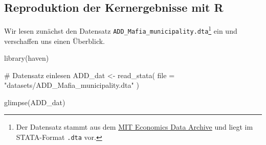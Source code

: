 \documentclass[
  a4paper,
  DIV=11,
  oneside]{scrreprt}
\newenvironment{Shaded}{\begin{snugshade}}{\end{snugshade}}
\newcommand{\AttributeTok}[1]{\textcolor[rgb]{0.40,0.45,0.13}{#1}}
\newcommand{\CommentTok}[1]{\textcolor[rgb]{0.37,0.37,0.37}{#1}}
\newcommand{\FunctionTok}[1]{\textcolor[rgb]{0.28,0.35,0.67}{#1}}
\newcommand{\NormalTok}[1]{\textcolor[rgb]{0.00,0.23,0.31}{#1}}
\newcommand{\OtherTok}[1]{\textcolor[rgb]{0.00,0.23,0.31}{#1}}
\newcommand{\StringTok}[1]{\textcolor[rgb]{0.13,0.47,0.30}{#1}}
\begin{document}
\subsection{Reproduktion der Kernergebnisse mit
R}\label{reproduktion-der-kernergebnisse-mit-r}

Wir lesen zunächst den Datensatz
\texttt{ADD\_Mafia\_municipality.dta}\footnote{Der Datensatz stammt aus
  dem
  \href{https://economics.mit.edu/people/faculty/daron-acemoglu/data-archive}{MIT
  Economics Data Archive} und liegt im STATA-Format \texttt{.dta} vor.}
ein und verschaffen uns einen Überblick.

\begin{Shaded}
\begin{Highlighting}[]
\FunctionTok{library}\NormalTok{(haven)}

\CommentTok{\# Datensatz einlesen}
\NormalTok{ADD\_dat }\OtherTok{\textless{}{-}} \FunctionTok{read\_stata}\NormalTok{(}
  \AttributeTok{file =} \StringTok{"datasets/ADD\_Mafia\_municipality.dta"}
\NormalTok{  )}

\FunctionTok{glimpse}\NormalTok{(ADD\_dat)}
\end{Highlighting}
\end{Shaded}
\end{document}

